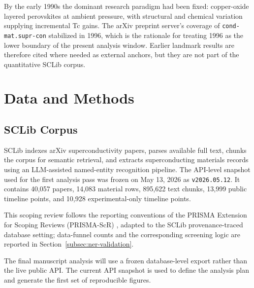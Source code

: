 \documentclass[11pt]{article}
\begin{document}
By the early 1990s the dominant research paradigm had been fixed: copper-oxide layered perovskites at ambient pressure, with structural and chemical variation supplying incremental Tc gains. The arXiv preprint server's coverage of \texttt{cond-mat.supr-con} stabilized in 1996, which is the rationale for treating 1996 as the lower boundary of the present analysis window. Earlier landmark results are therefore cited where needed as external anchors, but they are not part of the quantitative SCLib corpus.

\section{Data and Methods}

\subsection{SCLib Corpus}

SCLib \cite{sclib2026} indexes arXiv \cite{arxiv2026} superconductivity papers, parses available full text, chunks the corpus for semantic retrieval, and extracts superconducting materials records using an LLM-assisted named-entity recognition pipeline. The API-level snapshot used for the first analysis pass was frozen on May 13, 2026 as \texttt{v2026.05.12}. It contains 40,057 papers, 14,083 material rows, 895,622 text chunks, 13,999 public timeline points, and 10,928 experimental-only timeline points.

This scoping review follows the reporting conventions of the PRISMA Extension for Scoping Reviews (PRISMA-ScR) \cite{tricco2018prismascr,pageprisma2021}, adapted to the SCLib provenance-traced database setting; data-funnel counts and the corresponding screening logic are reported in Section~\ref{subsec:ner-validation}.

The final manuscript analysis will use a frozen database-level export rather than the live public API. The current API snapshot is used to define the analysis plan and generate the first set of reproducible figures.
\end{document}
